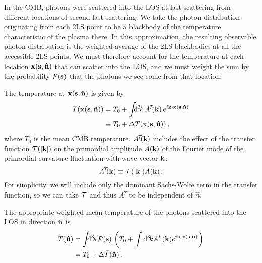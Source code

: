 \documentclass[fleqn,usenatbib]{mnras}
\begin{document}
    In the CMB, photons were scattered into the LOS at last-scattering from
    different locations of second-last scattering.  We take the photon
    distribution originating from each 2LS point to be a blackbody of the
    temperature characteristic of the plasma there.  In this approximation, the
    resulting observable photon distribution is the weighted average of the 2LS
    blackbodies at all the accessible 2LS points.  We must therefore account for
    the temperature at each location $\mathbf{x}(\mathbf{s},{\bf\hat{n}})$ that can scatter
    into the LOS, and we must weight the sum by the probability
    $\mathcal{P}(\mathbf{s})$ that the photons we see come from that
    location.\footnotemark

    The temperature at $\mathbf{x}(\mathbf{s}, {\bf\hat{n}})$ is given by
    \begin{align} \label{eqn:Tofx}
        T(\mbf{x}(\mbf{s}, \nhat))
            &=    
                  T_0
                + \int \!\!\!\dif[3]{k} \, A^{\!\mcal{T}\!\!}(\mbf{k}) \, \Exp{i \mbf{k} \cdot \mbf{x}(\mbf{s}, \nhat)} \\
            &\equiv
                  T_0
                + \DeltaT(\mbf{x}(\mbf{s}, \nhat))\,, \nonumber
    \end{align}
    where $T_0$ is the mean CMB temperature.  $A^{\!\mathcal{T}\!\!}(\mathbf{k})$
    includes the effect of the transfer function $\mathcal{T}(\lvert \mathbf{k} \rvert)$ on
    the primordial amplitude $A(\mathbf{k})$ of the Fourier mode of the primordial
    curvature fluctuation with wave vector $\mathbf{k}$:
    \begin{equation}
        A^{\!\mathcal{T}\!\!}(\mathbf{k})\equiv \mathcal{T}(\lvert \mathbf{k} \rvert) A(\mathbf{k}) \,.
    \end{equation}
    For simplicity, we will include only the dominant Sachs-Wolfe term in the
    transfer function, so we can take $\mathcal{T}$ and thus $A^{\!\mathcal{T}\!\!}$
    to be independent of $\hat{n}$.

    The appropriate weighted mean temperature of the photons scattered into the
    LOS in direction ${\bf\hat{n}}$ is
    \begin{align}
        \bar{T}(\nhat)
            &=
                \int\!\!\!\dif[3]{s}\, \mcal{P}(\mbf{s})\, \left(
                      T_0
                    + \int \dif[3]{k} A^{\!\mcal{T}}(\mbf{k}) \Exp{i\mbf{k}\cdot\mbf{x}(\mbf{s},\nhat)}
                \right)
            \\
            &=
                T_0 + \Delta \bar{T}(\nhat) \,.
    \end{align}
\end{document}
